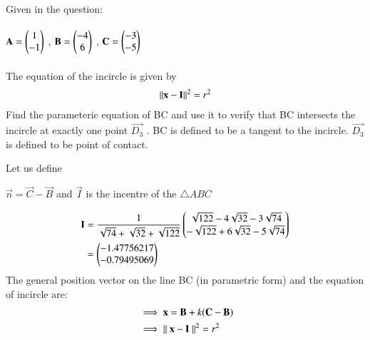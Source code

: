 \documentclass[journal,12pt,twocolumn]{IEEEtran}
\theoremstyle{remark}
\begin{document}


Given in the question:\\ \\
    $\mathbf{A} = \begin{pmatrix}1\\-1\end{pmatrix}$  ,
    $\mathbf{B} = \begin{pmatrix}-4\\6\end{pmatrix}$  ,
    $\mathbf{C} = \begin{pmatrix}-3\\-5\end{pmatrix}$ \\
\\
The equation of the incircle is given by
\begin{align}
\left\lVert\mathbf{x}-\mathbf{I}\right\rVert^2 = r^2
\end{align}
Find the parameteric equation of BC and use it to verify that BC
intersects the incircle at exactly one point $\vec{D_{3}}$ . BC is defined to be a
tangent to the incircle. $\vec{D_{3}}$ is defined to be point of contact. 

Let us define 

$\vec{n} = \vec{C}-\vec{B}$ and $\vec{I}$ is the incentre of the $\bigtriangleup ABC$

\begin{align}
\mathbf{I} &= \frac{1}{\sqrt{74}+\sqrt{32}+\sqrt{122}}\begin{pmatrix}{\sqrt{122}-4\sqrt{32}-3\sqrt{74}}\\{-\sqrt{122}+6\sqrt{32}-5\sqrt{74}}\end{pmatrix}\nonumber\\
&=\begin{pmatrix}-1.47756217 \\-0.79495069\end{pmatrix}
\end{align}
The general position vector on the line BC (in parametric form)  and the equation of incircle are:
\begin{align}
 &\implies \mathbf{x} = \mathbf{B} + k(\mathbf{C}-\mathbf{B})\\
 &\implies \left\lVert\ \mathbf{x} - \mathbf{I}\ \right\rVert^2 = r^2 
\end{align}
\end{document}
